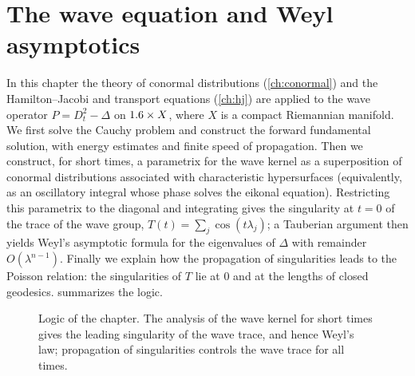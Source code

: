 \chapter{The wave equation and Weyl asymptotics}\label{ch:wave}
\providecommand{\vol}{\operatorname{vol}}
\providecommand{\inj}{\operatorname{inj}}
\providecommand{\Lset}{\mathcal{L}}
\usetikzlibrary{patterns}

In this chapter the theory of conormal distributions (\cref{ch:conormal}) and
the Hamilton--Jacobi and transport equations (\cref{ch:hj}) are applied to
the wave operator $P=D_t^2-\Delta$ on $1.6\times X$, where $X$ is a compact
Riemannian manifold. We first solve the Cauchy problem and construct the
forward fundamental solution, with energy estimates and finite speed of
propagation. Then we construct, for short times, a parametrix for the wave
kernel as a superposition of conormal distributions associated with
characteristic hypersurfaces (equivalently, as an oscillatory integral whose
phase solves the eikonal equation). Restricting this parametrix to the diagonal
and integrating gives the singularity at $t=0$ of the trace of the wave group,
$T(t)=\sum_j\cos(t\lambda_j)$; a Tauberian argument then yields Weyl's
asymptotic formula for the eigenvalues of $\Delta$ with remainder
$O(\lambda^{n-1})$. Finally we explain how the propagation of singularities
leads to the Poisson relation: the singularities of $T$ lie at $0$ and at the
lengths of closed geodesics.  summarizes the logic.

\begin{figure}[ht]
  \centering
  \caption{Logic of the chapter. The analysis of the wave kernel for short times
  gives the leading singularity of the wave trace, and hence Weyl's law; propagation of
  singularities controls the wave trace for all times.}
  \label{wave:fig:roadmap}
\end{figure}

